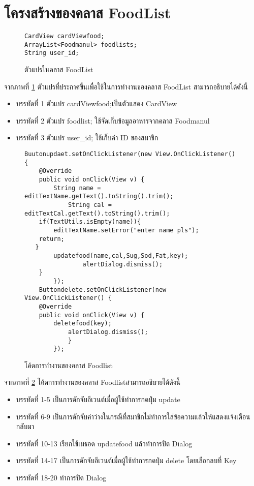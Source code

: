 	\section{โครงสร้างของคลาส FoodList}
	\begin{figure}[H]
		{\begin{lstlisting}
CardView cardViewfood;
ArrayList<Foodmanul> foodlists;
String user_id;

			\end{lstlisting}}
		\caption{ตัวแปรในคลาส FoodList}
		\label{Fig:foodlist1}
	\end{figure}
	จากภาพที่ \ref{Fig:foodlist1} ตัวแปรที่ประกาศขึ้นเพื่อใช้ในการทำงานของคลาส FoodList สามารถอธิบายได้ดังนี้
	\begin{itemize}[label={--}]
		\item บรรทัดที่ 1 ตัวแปร cardViewfood;เป็นตัวแสดง​ CardView
		\item บรรทัดที่ 2 ตัวแปร foodlist; ใช้จัดเก็บข้อมูลอาหารจากคลาส Foodmanul
		\item บรรทัดที่ 3 ตัวแปร user\_id; ใช้เก็บค่า ID ของสมาชิก
	\end{itemize}

	\begin{figure}[H]
		{\begin{lstlisting}
Buutonupdaet.setOnClickListener(new View.OnClickListener() {
	@Override
	public void onClick(View v) {
		String name = editTextName.getText().toString().trim();
			String cal = editTextCal.getText().toString().trim();
	if(TextUtils.isEmpty(name)){
		editTextName.setError("enter name pls");
	return;
   }
 		updatefood(name,cal,Sug,Sod,Fat,key);
				alertDialog.dismiss();
	}
		});
	Buttondelete.setOnClickListener(new View.OnClickListener() {
	@Override
	public void onClick(View v) {
		deletefood(key);
			alertDialog.dismiss();
			}
		});
\end{lstlisting}}
		\caption{โค้ดการทำงานของคลาส Foodlist}
		\label{Fig:foodlis1}
	\end{figure}
	\newpage
	จากภาพที่ \ref{Fig:foodlis1} โค้ดการทำงานของคลาส Foodlistสามารถอธิบายได้ดังนี้
	\begin{itemize}[label={--}]
		\item บรรทัดที่ 1-5 เป็นการดักจับอีเวนต์เมื่อผู้ใช้ทำการกดปุ่ม update
		\item บรรทัดที่ 6-9  เป็นการดักจับค่าว่างในกรณีที่สมาชิกไม่ทำการใส่ข้อความแล้วให้แสดงแจ้งเตือนกลับมา
		\item บรรทัดที่ 10-13 เรียกใช้เมธอด updatefood แล้วทำการปิด Dialog
		\item บรรทัดที่ 14-17  เป็นการดักจับอีเวนต์เมื่อผู้ใช้ทำการกดปุ่ม delete โดยเลือกลบที่ Key
		\item บรรทัดที่ 18-20  ทำการปิด Dialog
\end{itemize}


